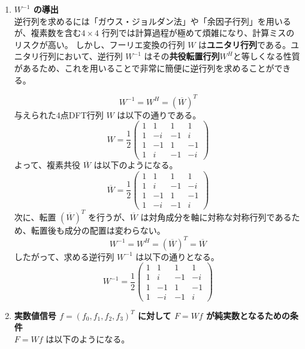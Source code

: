 \documentclass[11pt,a4paper]{jlreq}
\begin{document}
\begin{enumerate}
    \item[(A)] \textbf{\boldmath $W^{-1}$ の導出} \\
    逆行列を求めるには「ガウス・ジョルダン法」や「余因子行列」を用いるが、複素数を含む$4 \times 4$ 行列では計算過程が極めて煩雑になり、計算ミスのリスクが高い。
    しかし、フーリエ変換の行列 $W$ は\textbf{ユニタリ行列}である。ユニタリ行列において、逆行列 $W^{-1}$ はその\textbf{共役転置行列}$W^H$と等しくなる性質があるため、これを用いることで非常に簡便に逆行列を求めることができる。

    \[
        W^{-1} = W^H = (\overline{W})^T
    \]
    \noindent
    与えられた4点DFT行列 $W$ は以下の通りである。
    \[
        W = \frac{1}{2} \begin{pmatrix} 
        1 & 1 & 1 & 1 \\ 
        1 & -i & -1 & i \\ 
        1 & -1 & 1 & -1 \\ 
        1 & i & -1 & -i 
        \end{pmatrix}
    \]
    \noindent
    よって、複素共役 $\overline{W}$ は以下のようになる。
    \[
        \overline{W} = \frac{1}{2} \begin{pmatrix} 
        1 & 1 & 1 & 1 \\ 
        1 & i & -1 & -i \\ 
        1 & -1 & 1 & -1 \\ 
        1 & -i & -1 & i 
        \end{pmatrix}
    \]
    \noindent
    次に、転置 $(\overline{W})^T$ を行うが、$\overline{W}$ は対角成分を軸に対称な対称行列であるため、転置後も成分の配置は変わらない。
    \[
        W^{-1} = W^H = (\overline{W})^T = \overline{W}
    \]
    \noindent
    したがって、求める逆行列 $W^{-1}$ は以下の通りとなる。
    \[
        \boxed{ W^{-1} = \frac{1}{2} \begin{pmatrix} 
        1 & 1 & 1 & 1 \\ 
        1 & i & -1 & -i \\ 
        1 & -1 & 1 & -1 \\ 
        1 & -i & -1 & i 
        \end{pmatrix} }
    \]

    \item[(B)] \textbf{実数値信号 \boldmath $f = (f_0, f_1, f_2, f_3)^T$ に対して \boldmath $F = Wf$ が純実数となるための条件} \\
    $F = Wf$ は以下のようになる。


\end{enumerate}
\end{document}
